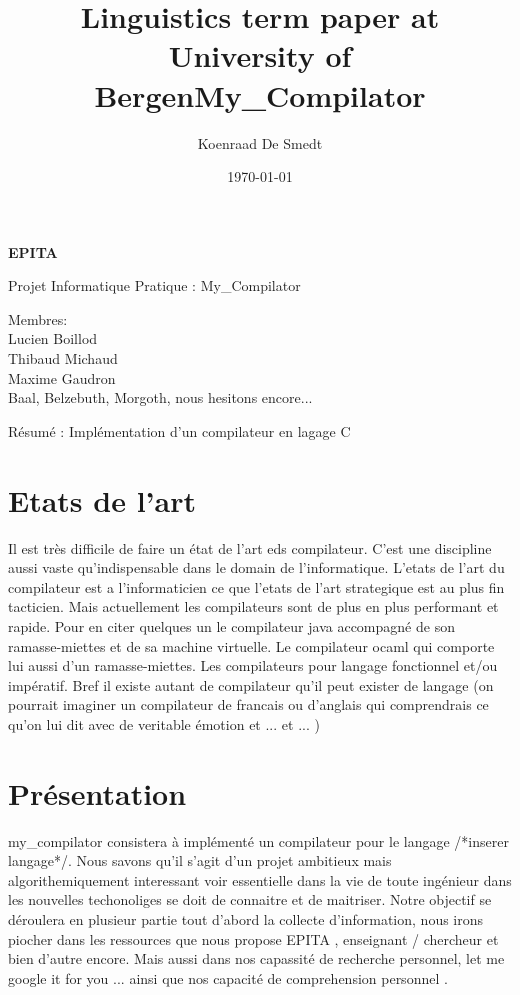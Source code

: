 \documentclass[a4paper,12pt]{article}
\title{Linguistics term paper at University of Bergen}
\author{Koenraad De Smedt}
\date{\today}
\title{My\_Compilator}
\begin{document}
\begin{center} \vfill
\textbf{\Large EPITA}

{\large Projet Informatique Pratique : My\_Compilator} 

\vspace{2cm}


Membres:\\

	Lucien Boillod\\
    Thibaud Michaud\\
    Maxime Gaudron\\
    Baal, Belzebuth, Morgoth, nous hesitons encore...

\vspace{5cm}

Résumé : Implémentation d'un compilateur en lagage C 
\end{center} \clearpage

\section{Etats de l'art}
Il est très difficile de faire un état de l'art eds compilateur. C'est une
discipline aussi vaste qu'indispensable dans le domain de l'informatique.
L'etats de l'art du compilateur est a l'informaticien ce que l'etats de l'art
strategique est au plus fin tacticien. Mais actuellement les compilateurs sont
de plus en plus performant et rapide. Pour en citer quelques un le compilateur
java accompagné de son ramasse-miettes et de sa machine virtuelle. Le
compilateur ocaml qui comporte lui aussi d'un ramasse-miettes. Les compilateurs
pour langage fonctionnel et/ou impératif. Bref il existe autant de compilateur
qu'il peut exister de langage (on pourrait imaginer un compilateur de francais
ou d'anglais qui comprendrais ce qu'on lui dit avec de veritable émotion et
... et ... )

\section{Présentation} \label{sec:intro}
my\_compilator consistera à implémenté un compilateur pour le langage /*inserer langage*/. 
Nous savons qu'il s'agit d'un projet ambitieux mais algorithemiquement 
interessant voir essentielle dans la vie de toute ingénieur dans les nouvelles
techonoliges se doit de connaitre et de maitriser.
Notre objectif se déroulera en plusieur partie tout d'abord la collecte
d'information, nous irons piocher dans les ressources que nous propose EPITA ,
enseignant / chercheur et bien d'autre encore. Mais aussi dans nos capassité de
recherche personnel, let me google it for you ... ainsi que nos capacité de
comprehension personnel . 
\end{document}
